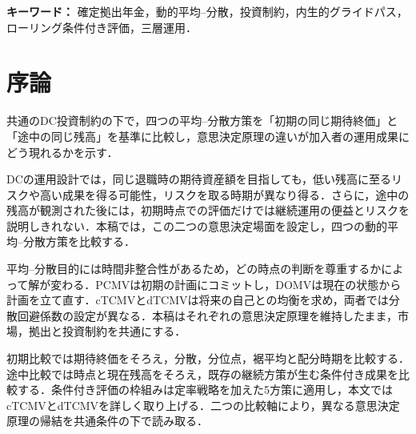 \documentclass[10pt,a4paper]{article}
\theoremstyle{plain}
\theoremstyle{definition}
\begin{document}
\begin{abstract}
\begin{sloppypar}
実務上は，cTCMVを標準デフォルト，DOMVを定期的見直し，dTCMVを総年金富に基づく個別化助言とする三層構造を提案する．PCMVはこれらの運用層には含めず，目標設定と平均--分散のトレードオフを整理する設計ベンチマークとして位置付ける．MVSは独立した第四層に置かず，係数較正，非凹性および数値安定性を追加検証すべき研究拡張として位置付ける．本稿の実務的貢献は，動的最適制御理論と実装可能なDCガバナンスを結び付ける点にある．外生的に設定されたグライドパスの形状を比較するのではなく，加入者利益の追求と実装のしやすさの双方に基づいて，グライドパスを導出，検証，比較し，各実務層へ割り当てる統一的な方法を提示する．数値計算では，共通の後退・前進体系により，方策形状，終端富分布，下方リスクおよび制約拘束を比較する．ローリング条件付き成果指標は，途中時点における低・中・高残高状態からの残存期間成果を同じ尺度で可視化し，各戦略の便益とリスクを加入者状態別に説明可能にする．さらに，モーメント整合性，確率質量保存，格子安定性および四解概念の既存研究との結果比較を通じて，再現性を確保する．
\end{sloppypar}
\end{abstract}

\noindent\textbf{キーワード：} 確定拠出年金，動的平均--分散，投資制約，内生的グライドパス，ローリング条件付き評価，三層運用．
\clearpage\setcounter{tocdepth}{1}{\footnotesize\tableofcontents}\clearpage
\section{序論}
\label{sec:introduction}
共通のDC投資制約の下で，四つの平均--分散方策を「初期の同じ期待終価」と「途中の同じ残高」を基準に比較し，意思決定原理の違いが加入者の運用成果にどう現れるかを示す．

DCの運用設計では，同じ退職時の期待資産額を目指しても，低い残高に至るリスクや高い成果を得る可能性，リスクを取る時期が異なり得る．さらに，途中の残高が観測された後には，初期時点での評価だけでは継続運用の便益とリスクを説明しきれない．本稿では，この二つの意思決定場面を設定し，四つの動的平均--分散方策を比較する．

平均--分散目的には時間非整合性があるため，どの時点の判断を尊重するかによって解が変わる．PCMVは初期の計画にコミットし，DOMVは現在の状態から計画を立て直す．cTCMVとdTCMVは将来の自己との均衡を求め，両者では分散回避係数の設定が異なる．本稿はそれぞれの意思決定原理を維持したまま，市場，拠出と投資制約を共通にする．

初期比較では期待終価をそろえ，分散，分位点，裾平均と配分時期を比較する．途中比較では時点と現在残高をそろえ，既存の継続方策が生む条件付き成果を比較する．条件付き評価の枠組みは定率戦略を加えた5方策に適用し，本文ではcTCMVとdTCMVを詳しく取り上げる．二つの比較軸により，異なる意思決定原理の帰結を共通条件の下で読み取る．
\end{document}
